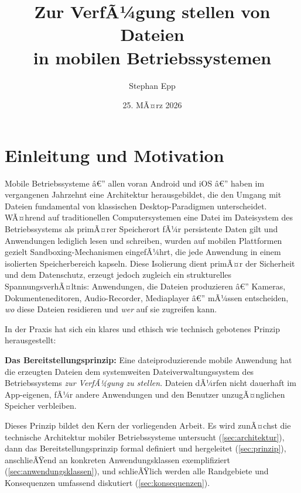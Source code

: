 ﻿\documentclass[12pt, a4paper]{article}
\title{\textbf{Zur VerfÃ¼gung stellen von Dateien\\ in mobilen Betriebssystemen}}
\author{Stephan Epp}
\date{25. MÃ¤rz 2026}
\begin{document}

\maketitle
\tableofcontents
\newpage

\section{Einleitung und Motivation}
\label{sec:einleitung}

Mobile Betriebssysteme â€” allen voran Android und iOS â€” haben im vergangenen Jahrzehnt
eine Architektur herausgebildet, die den Umgang mit Dateien fundamental von klassischen
Desktop-Paradigmen unterscheidet. WÃ¤hrend auf traditionellen Computersystemen eine
Datei im Dateisystem des Betriebssystems als primÃ¤rer Speicherort fÃ¼r persistente Daten
gilt und Anwendungen lediglich lesen und schreiben, wurden auf mobilen Plattformen
gezielt Sandboxing-Mechanismen eingefÃ¼hrt, die jede Anwendung in einem isolierten
Speicherbereich kapseln. Diese Isolierung dient primÃ¤r der Sicherheit und dem Datenschutz,
erzeugt jedoch zugleich ein strukturelles SpannungsverhÃ¤ltnis: Anwendungen, die Dateien
produzieren â€” Kameras, Dokumenteneditoren, Audio-Recorder, Mediaplayer â€” mÃ¼ssen
entscheiden, \emph{wo} diese Dateien residieren und \emph{wer} auf sie zugreifen kann.

In der Praxis hat sich ein klares und ethisch wie technisch gebotenes Prinzip herausgestellt:

\noindent\textbf{Das Bereitstellungsprinzip:} Eine dateiproduzierende mobile Anwendung hat die
erzeugten Dateien dem systemweiten Dateiverwaltungssystem des Betriebssystems
\emph{zur VerfÃ¼gung zu stellen}. Dateien dÃ¼rfen nicht dauerhaft im App-eigenen,
fÃ¼r andere Anwendungen und den Benutzer unzugÃ¤nglichen Speicher verbleiben.

Dieses Prinzip bildet den Kern der vorliegenden Arbeit. Es wird zunÃ¤chst die technische
Architektur mobiler Betriebssysteme untersucht (\cref{sec:architektur}), dann das
Bereitstellungsprinzip formal definiert und hergeleitet (\cref{sec:prinzip}), anschlieÃŸend
an konkreten Anwendungsklassen exemplifiziert (\cref{sec:anwendungsklassen}), und
schlieÃŸlich werden alle Randgebiete und Konsequenzen umfassend diskutiert
(\cref{sec:konsequenzen}).
\end{document}
